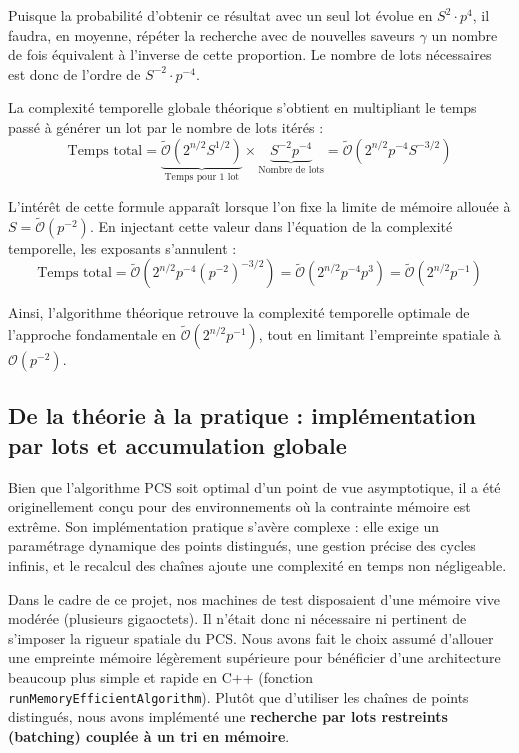 \documentclass[a4paper,11pt]{article}
\begin{document}
Puisque la probabilité d'obtenir ce résultat avec un seul lot évolue en $S^2 \cdot p^4$, il faudra, en moyenne, répéter la recherche avec de nouvelles saveurs $\gamma$ un nombre de fois équivalent à l'inverse de cette proportion. Le nombre de lots nécessaires est donc de l'ordre de $S^{-2} \cdot p^{-4}$.

La complexité temporelle globale théorique s'obtient en multipliant le temps passé à générer un lot par le nombre de lots itérés :
\begin{equation*}
    \text{Temps total} = \underbrace{\tilde{\mathcal{O}}(2^{n/2}S^{1/2})}_{\text{Temps pour 1 lot}} \times \underbrace{S^{-2}p^{-4}}_{\text{Nombre de lots}} = \tilde{\mathcal{O}}(2^{n/2}p^{-4}S^{-3/2})
\end{equation*}

L'intérêt de cette formule apparaît lorsque l'on fixe la limite de mémoire allouée à $S = \tilde{\mathcal{O}}(p^{-2})$. En injectant cette valeur dans l'équation de la complexité temporelle, les exposants s'annulent :
\begin{equation*}
    \text{Temps total} = \tilde{\mathcal{O}}\left(2^{n/2} p^{-4} (p^{-2})^{-3/2}\right) = \tilde{\mathcal{O}}\left(2^{n/2} p^{-4} p^3\right) = \tilde{\mathcal{O}}(2^{n/2}p^{-1})
\end{equation*}

Ainsi, l'algorithme théorique retrouve la complexité temporelle optimale de l'approche fondamentale en $\tilde{\mathcal{O}}(2^{n/2}p^{-1})$, tout en limitant l'empreinte spatiale à $\mathcal{O}(p^{-2})$.

\subsection{De la théorie à la pratique : implémentation par lots et accumulation globale}

Bien que l'algorithme PCS soit optimal d'un point de vue asymptotique, il a été originellement conçu pour des environnements où la contrainte mémoire est extrême. Son implémentation pratique s'avère complexe : elle exige un paramétrage dynamique des points distingués, une gestion précise des cycles infinis, et le recalcul des chaînes ajoute une complexité en temps non négligeable. 

Dans le cadre de ce projet, nos machines de test disposaient d'une mémoire vive modérée (plusieurs gigaoctets). Il n'était donc ni nécessaire ni pertinent de s'imposer la rigueur spatiale du PCS. Nous avons fait le choix assumé d'allouer une empreinte mémoire légèrement supérieure pour bénéficier d'une architecture beaucoup plus simple et rapide en C++ (fonction \texttt{run\allowbreak Memory\allowbreak Efficient\allowbreak Algorithm}). Plutôt que d'utiliser les chaînes de points distingués, nous avons implémenté une \textbf{recherche par lots restreints (batching) couplée à un tri en mémoire}.
\end{document}
